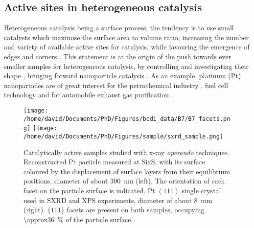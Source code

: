 \subsection{Active sites in heterogeneous catalysis}

Heterogeneous catalysis being a surface process, the tendency is to use small catalysts which maximise the surface area to volume ratio, increasing the number and variety of available active sites for catalysis, while favouring the emergence of edges and corners \parencite{Zambelli1996, Hendriksen2010, Vogt2022}.
This statement is at the origin of the push towards ever smaller samples for heterogeneous catalysis, by controlling and investigating their shape \parencite{Lee2006, Tian2007, Bratlie2007, Lee2009}, bringing forward nanoparticle catalysis \parencite{Che1989, Raimondi2005, Arico2005, Molenbroek2009, VanSanten2010, Schauermann2013}.
As an example, platinum (Pt) nanoparticles are of great interest for the petrochemical industry \parencite{Astruc2005, Astruc2020}, fuel cell technology and for automobile exhaust gas purification \parencite{Heck2001}.

\begin{figure}[!htb]
    \centering
    \texttt{[image: /home/david/Documents/PhD/Figures/bcdi\_data/B7/B7\_facets.png]}
    \texttt{[image: /home/david/Documents/PhD/Figures/sample/sxrd\_sample.png]}
    \caption{
        Catalytically active samples studied with x-ray \textit{operando} techniques.
        Reconstructed Pt particle measured at SixS, with its surface coloured by the displacement of surface layers from their equilibrium positions, diameter of about \qty{300}{\nm} (left).
        The orientation of each facet on the particle surface is indicated.
        Pt $(111)$ single crystal used in SXRD and XPS experiments, diameter of about \qty{8}{\mm} (right).
        $\{111\}$ facets are present on both samples, occupying \qty{\approx36}{\percent} of the particle surface.
    }
    \label{fig:Samples}
\end{figure}

